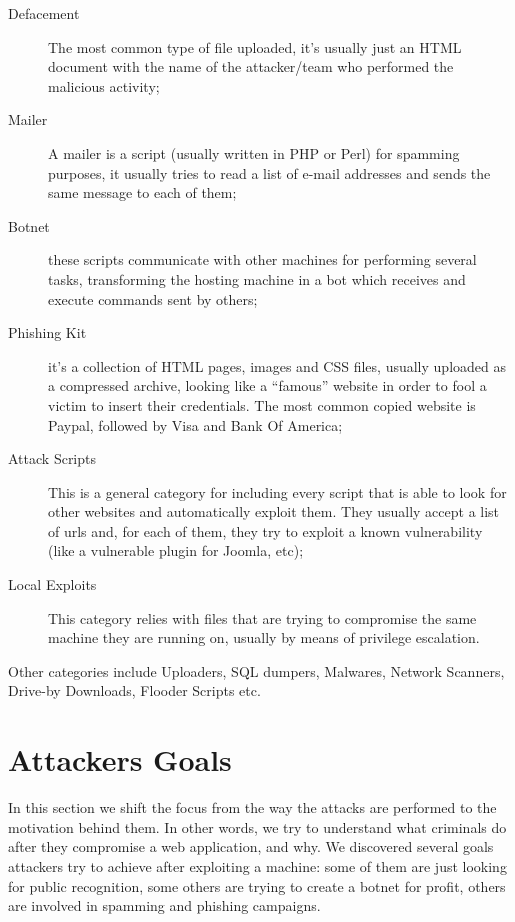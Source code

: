 \begin{description}
\item[Defacement] The most common type of file uploaded, it's usually just an HTML document with the name of the attacker/team who performed the malicious activity;
\item[Mailer] A mailer is a script (usually written in PHP or Perl) for spamming purposes, it usually tries to read a list of e-mail addresses and sends the same message to each of them;
\item[Botnet] these scripts communicate with other machines for performing several tasks, transforming the hosting machine in a bot which receives and execute commands sent by others;
\item[Phishing Kit] it's a collection of HTML pages, images and CSS files, usually uploaded as a compressed archive, looking like a ``famous'' website in order to fool a victim to insert their credentials. The most common copied website is Paypal, followed by Visa and Bank Of America;
\item[Attack Scripts] This is a general category for including every script that is able to look for other websites and automatically exploit them. They usually accept a list of urls and, for each of them, they try to exploit a known vulnerability (like a vulnerable plugin for Joomla, etc);
\item[Local Exploits] This category relies with files that are trying to compromise the same machine they are running on, usually by means of privilege escalation.
\end{description}

Other categories include Uploaders, SQL dumpers, Malwares, Network Scanners, Drive-by Downloads, Flooder Scripts etc.

\section{Attackers Goals}

In this section we shift the focus from the way the attacks are performed to the motivation behind them. In other words, we try to understand what criminals do after they compromise a web application, and why. We discovered several goals attackers try to achieve after exploiting a machine: some of them are just looking for public recognition, some others are trying to create a botnet for profit, others are involved in spamming and phishing campaigns.

